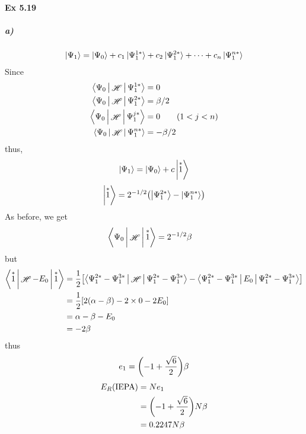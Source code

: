 \documentclass[a4paper]{article}
\DeclareMathOperator{\sH}{\mathscr{H}}
\newcommand{\ex}[1]{\paragraph{Ex #1}}
\newcommand{\subex}[1]{\subparagraph{#1}}
\numberwithin{equation}{subsection}
\begin{document}
\ex{5.19}
\subex{a)}
\begin{align}
\ket{\Psi_1} = \ket{\Psi_0} + c_1\ket{\Psi_1^{1*}} + c_2\ket{\Psi_1^{2*}} + \cdots + c_n\ket{\Psi_1^{n*}}
\end{align}
Since
\begin{align}
\Braket{\Psi_0 | \sH | \Psi_1^{1*} } &= 0\\
\Braket{\Psi_0 | \sH | \Psi_1^{2*} } &= \beta/2 \\
\Braket{\Psi_0 | \sH | \Psi_1^{j*} } &= 0 \qquad (1<j<n)\\
\Braket{\Psi_0 | \sH | \Psi_1^{n*} } &= -\beta/2 
\end{align}
thus, 
\begin{align}
\ket{\Psi_1} = \ket{\Psi_0} + c\Ket{ \overset{*}{1}} 
\end{align}
\begin{equation}\label{key}
\Ket{ \overset{*}{1}} = 2^{-1/2} \qty(\Ket{\Psi_1^{2*} } - \Ket{\Psi_1^{n*} })
\end{equation}
As before, we get
\begin{align}
\Braket{\Psi_0 | \sH | \overset{*}{1}} %
&= 2^{-1/2}\beta
\end{align}
but
\begin{align}
\Braket{ \overset{*}{1} | \sH - E_0 | \overset{*}{1}} 
&= \dfrac{1}{2} \qty[
\Braket{\Psi_1^{2*} - \Psi_1^{3*} | \sH | \Psi_1^{2*} - \Psi_1^{3*}} 
- \Braket{\Psi_1^{2*} - \Psi_1^{3*} | E_0 | \Psi_1^{2*} - \Psi_1^{3*}}
] \notag\\
&= \dfrac{1}{2} \qty[ 2(\alpha-\beta) - 2\times 0 - 2E_0] \notag\\
&= \alpha - \beta - E_0 \notag\\
&= -2\beta
\end{align}
thus
\begin{equation}\label{key}
e_1 = \qty(-1 + \dfrac{\sqrt{6}}{2})\beta
\end{equation}
\begin{align}\label{key}
E_R(\text{IEPA}) &= Ne_1 \notag\\
&= \qty(-1 + \dfrac{\sqrt{6}}{2})N\beta \notag\\
&= 0.2247 N\beta
\end{align}
\end{document}
